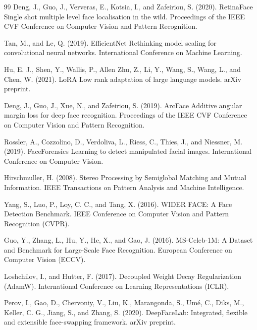 \documentclass[12pt,a4paper]{report}
\begin{document}
\begin{thebibliography}{99}
Deng, J., Guo, J., Ververas, E., Kotsia, I., and Zafeiriou, S. (2020). RetinaFace Single shot multiple level face localisation in the wild. Proceedings of the IEEE CVF Conference on Computer Vision and Pattern Recognition.

Tan, M., and Le, Q. (2019). EfficientNet Rethinking model scaling for convolutional neural networks. International Conference on Machine Learning.

Hu, E. J., Shen, Y., Wallis, P., Allen Zhu, Z., Li, Y., Wang, S., Wang, L., and Chen, W. (2021). LoRA Low rank adaptation of large language models. arXiv preprint.

Deng, J., Guo, J., Xue, N., and Zafeiriou, S. (2019). ArcFace Additive angular margin loss for deep face recognition. Proceedings of the IEEE CVF Conference on Computer Vision and Pattern Recognition.

Rossler, A., Cozzolino, D., Verdoliva, L., Riess, C., Thies, J., and Niessner, M. (2019). FaceForensics Learning to detect manipulated facial images. International Conference on Computer Vision.

Hirschmuller, H. (2008). Stereo Processing by Semiglobal Matching and Mutual Information. IEEE Transactions on Pattern Analysis and Machine Intelligence.

Yang, S., Luo, P., Loy, C. C., and Tang, X. (2016). WIDER FACE: A Face Detection Benchmark. IEEE Conference on Computer Vision and Pattern Recognition (CVPR).

Guo, Y., Zhang, L., Hu, Y., He, X., and Gao, J. (2016). MS-Celeb-1M: A Dataset and Benchmark for Large-Scale Face Recognition. European Conference on Computer Vision (ECCV).

Loshchilov, I., and Hutter, F. (2017). Decoupled Weight Decay Regularization (AdamW). International Conference on Learning Representations (ICLR).

Perov, I., Gao, D., Chervoniy, V., Liu, K., Marangonda, S., Umé, C., Diks, M., Keller, C. G., Jiang, S., and Zhang, S. (2020). DeepFaceLab: Integrated, flexible and extensible face-swapping framework. arXiv preprint.
\end{thebibliography}
\end{document}

